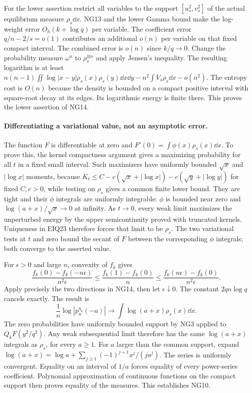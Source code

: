 \documentclass[11pt]{article}
\begin{document}
For the lower assertion restrict all variables to the support
$[u_s^2,v_s^2]$ of the actual equilibrium measure $\rho_s\dd x$.
NG13 and the lower Gamma bound make the log-weight error $O_h(k+\log q)$
per variable. The coefficient error $q/n-2/s=o(1)$ contributes an
additional $o(n)$ per variable on that fixed compact interval. The
combined error is $o(n)$ since $k/q\to0$.
Change the probability measure $\omega^n$ to $\rho_s^{\otimes n}$
and apply Jensen's inequality. The resulting logarithm is at least
$n(n-1)\iint\log|x-y|\rho_s(x)\rho_s(y)\dd x\dd y
-n^2\int V_s\rho_s\dd x-o(n^2)$.
The entropy cost is $O(n)$ because the density is bounded on a compact
positive interval with square-root decay at its edges. Its logarithmic
energy is finite there. This proves the lower assertion of NG14.

\paragraph{Differentiating a variational value, not an asymptotic error.}
The function $F$ is differentiable at zero and
$F'(0)=\int\phi(x)\rho_s(x)\dd x$.
To prove this, the kernel compactness argument gives a maximizing
probability for all $t$ in a fixed small interval. Such maximizers have
uniformly bounded $\sqrt x$ and $|\log x|$ moments, because
$K_t\le C-c(\sqrt x+|\log x|)-c(\sqrt y+|\log y|)$ for fixed
$C,c>0$, while testing on $\rho_s$ gives a common finite lower bound.
They are tight and their $\phi$ integrals are uniformly integrable:
$\phi$ is bounded near zero and $\log(a+x)/\sqrt x\to0$ at infinity.
As $t\to0$, every weak limit maximizes the unperturbed energy by the
upper semicontinuity proved with truncated kernels. Uniqueness in EIQ23
therefore forces that limit to be $\rho_s$. The two variational tests
at $t$ and zero bound the secant of $F$ between the corresponding
$\phi$ integrals; both converge to the asserted value.

For $\epsilon>0$ and large $n$, convexity of $f_k$ gives
\[
 \frac{f_k(0)-f_k(-n\epsilon)}{n^2\epsilon}
 \le\frac{f_k(1)-f_k(0)}n
 \le\frac{f_k(n\epsilon)-f_k(0)}{n^2\epsilon}.
\]
Apply precisely the two directions in NG14, then let $\epsilon\downarrow0$.
The constant $2qn\log q$ cancels exactly. The result is
\begin{equation}\tag{NG15}
 \frac1n\log|p_n^{\eta_k}(-a)|\longrightarrow
                     \int\log(a+x)\rho_s(x)\dd x.
\end{equation}
The zero probabilities have uniformly bounded support by NG3 applied
to $Q_kF(y^2/q^2)$. Any weak subsequential limit therefore has the
same $\log(a+x)$ integrals as $\rho_s$, for every $a\ge1$.
For $a$ larger than the common support, expand
$\log(a+x)=\log a+\sum_{j\ge1}(-1)^{j+1}x^j/(ja^j)$.
The series is uniformly convergent. Equality on an interval of $1/a$
forces equality of every power-series coefficient. Polynomial
approximation of continuous functions on the compact support then
proves equality of the measures. This establishes NG10.
\end{document}
